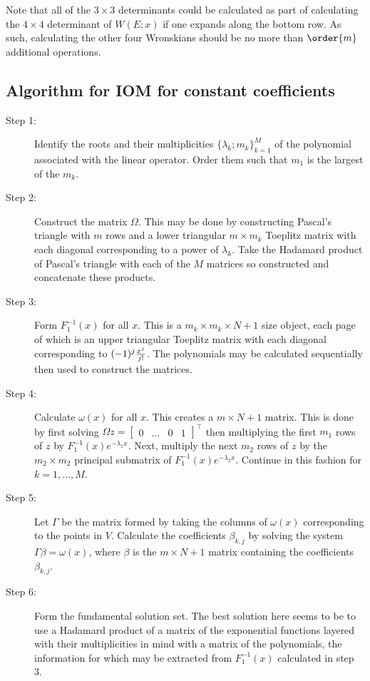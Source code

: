 \documentclass{article}
\begin{document}
Note that all of the $3 \times 3$ determinants could be calculated as part of calculating the $4 \times 4$ determinant of $W(E;x)$ if one expands along the bottom row.
As such, calculating the other four Wronskians should be no more than $\order{m}$ additional operations.

\subsection{Algorithm for IOM for constant coefficients}

\begin{description}
\item[Step 1:] Identify the roots and their multiplicities $\{ \lambda_k ; m_k \}_{k=1}^M$ of the polynomial associated with the linear operator.
Order them such that $m_1$ is the largest of the $m_k$.
\item[Step 2:] Construct the matrix $\Omega$.
This may be done by constructing Pascal's triangle with $m$ rows and a lower triangular $m \times m_k$ Toeplitz matrix with each diagonal corresponding to a power of $\lambda_k$.
Take the Hadamard product of Pascal's triangle with each of the $M$ matrices so constructed and concatenate these products.
\item[Step 3:] Form $F_1^{-1}(x)$ for all $x$.
This is a $m_k \times m_k \times N+1$ size object, each page of which is an upper triangular Toeplitz matrix with each diagonal corresponding to $(-1)^j \frac{x^j}{j!}$.
The polynomials may be calculated sequentially then used to construct the matrices.
\item[Step 4:] Calculate $\omega(x)$ for all $x$.
This creates a $m \times N+1$ matrix.
This is done by first solving $\Omega z = \begin{bmatrix} 0 & \dots & 0 & 1 \end{bmatrix}^\top$ then multiplying the first $m_1$ rows of $z$ by $F_1^{-1}(x) e^{-\lambda_1 x}$.
Next, multiply the next $m_2$ rows of $z$ by the $m_2 \times m_2$ principal submatrix of $F_1^{-1}(x) e^{-\lambda_2 x}$.
Continue in this fashion for $k=1,...,M$.
\item[Step 5:] Let $\Gamma$ be the matrix formed by taking the columns of $\omega(x)$ corresponding to the points in $V$.
Calculate the coefficients $\beta_{k,j}$ by solving the system $\Gamma \beta = \omega(x)$, where $\beta$ is the $m \times N+1$ matrix containing the coefficients $\beta_{k,j}$.
\item[Step 6:] Form the fundamental solution set.
The best solution here seems to be to use a Hadamard product of a matrix of the exponential functions layered with their multiplicities in mind with a matrix of the polynomials, the information for which may be extracted from $F_1^{-1}(x)$ calculated in step 3.

\end{description}
\end{document}
